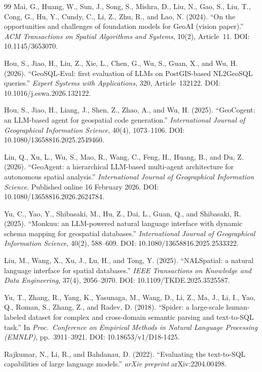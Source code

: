 \documentclass[11pt]{article}
\begin{document}
\begin{thebibliography}{99}
 Mai, G., Huang, W., Sun, J., Song, S., Mishra, D., Liu, N., Gao, S., Liu, T., Cong, G., Hu, Y., Cundy, C., Li, Z., Zhu, R., and Lao, N. (2024). ``On the opportunities and challenges of foundation models for GeoAI (vision paper).'' \emph{ACM Transactions on Spatial Algorithms and Systems}, 10(2), Article~11. DOI: 10.1145/3653070.

 Hou, S., Jiao, H., Liu, Z., Xie, L., Chen, G., Wu, S., Guan, X., and Wu, H. (2026). ``GeoSQL-Eval: first evaluation of LLMs on PostGIS-based NL2GeoSQL queries.'' \emph{Expert Systems with Applications}, 320, Article~132122. DOI: 10.1016/j.eswa.2026.132122.

 Hou, S., Jiao, H., Liang, J., Shen, Z., Zhao, A., and Wu, H. (2025). ``GeoCogent: an LLM-based agent for geospatial code generation.'' \emph{International Journal of Geographical Information Science}, 40(4), 1073--1106. DOI: 10.1080/13658816.2025.2549460.

 Lin, Q., Xu, L., Wu, S., Mao, R., Wang, C., Feng, H., Huang, B., and Du, Z. (2026). ``GeoAgent: a hierarchical LLM-based multi-agent architecture for autonomous spatial analysis.'' \emph{International Journal of Geographical Information Science}. Published online 16 February 2026. DOI: 10.1080/13658816.2026.2624784.

Yu, C., Yao, Y., Shibasaki, M., Hu, Z., Dai, L., Guan, Q., and Shibasaki, R.
(2025). ``Monkuu: an LLM-powered natural language interface with dynamic
schema mapping for geospatial databases.'' \emph{International Journal of
Geographical Information Science}, 40(2), 588--609.
DOI: 10.1080/13658816.2025.2533322.

 Liu, M., Wang, X., Xu, J., Lu, H., and Tong, Y. (2025). ``NALSpatial: a natural language interface for spatial databases.'' \emph{IEEE Transactions on Knowledge and Data Engineering}, 37(4), 2056--2070. DOI: 10.1109/TKDE.2025.3525587.

 Yu, T., Zhang, R., Yang, K., Yasunaga, M., Wang, D., Li, Z., Ma, J., Li, I., Yao, Q., Roman, S., Zhang, Z., and Radev, D. (2018). ``Spider: a large-scale human-labeled dataset for complex and cross-domain semantic parsing and text-to-SQL task.'' In \emph{Proc.\ Conference on Empirical Methods in Natural Language Processing (EMNLP)}, pp.~3911--3921. DOI: 10.18653/v1/D18-1425.

 Rajkumar, N., Li, R., and Bahdanau, D. (2022). ``Evaluating the text-to-SQL capabilities of large language models.'' \emph{arXiv preprint} arXiv:2204.00498.


\end{thebibliography}
\end{document}
